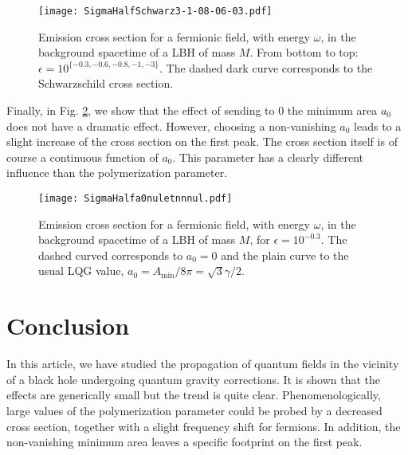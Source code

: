 \documentclass[twocolumn,amsmath,amssymb,prl,10pt,nofootinbib,superscriptaddress]{revtex4}
\begin{document}
\begin{figure}
\centering
    \texttt{[image: SigmaHalfSchwarz3-1-08-06-03.pdf]}  
 \caption{Emission cross section for a fermionic field, with energy $\omega$, in the background spacetime of a LBH of mass $M$. From bottom to top: $\epsilon=10^{ \{-0.3,-0.6,-0.8,-1,-3\}}$. The dashed dark curve corresponds to the Schwarzschild cross section.}
 \label{res}
 
 \end{figure}
 
 
Finally, in Fig. \ref{a0}, we show that the effect of sending to 0 the minimum area $a_0$ does not have a dramatic effect. However, choosing a non-vanishing $a_0$ leads to a slight increase of the cross section on the first peak. The cross section itself is of course a continuous function of $a_0$. This parameter has a clearly different influence than the polymerization parameter. 

\begin{figure}
    \texttt{[image: SigmaHalfa0nuletnnnul.pdf]}  
 \caption{Emission cross section for a fermionic field, with energy $\omega$, in the background spacetime of a LBH of mass $M$, for  $\epsilon =10^{-0.3}$. The dashed curved corresponds to $a_0=0$ and the plain curve to the usual LQG value, $a_{0}=A_{\text{min}}/8\pi=\sqrt{3}\gamma/2$.}
 \label{a0}
 \end{figure}
 
 
 



\section{Conclusion}

In this article, we have studied the propagation of quantum fields in the vicinity of a black hole undergoing quantum gravity corrections. It is shown that the effects are generically small but the trend is quite clear. Phenomenologically, large values of the polymerization parameter could be probed by a decreased cross section, together with a slight frequency shift for fermions.  In addition, the non-vanishing minimum area leaves a specific footprint on the first peak.\\
\end{document}
